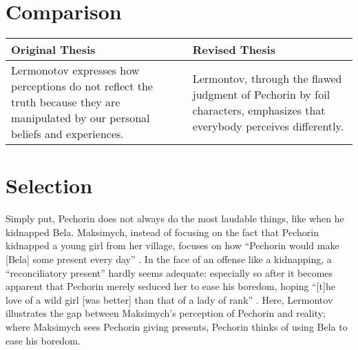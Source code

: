 \documentclass[a4paper,12pt]{article}
\newcommand{\mcite}{\mancite\cite}
\begin{document}
    \section{Comparison}
        \begin{tabular}{|p{}|p{}|}
            \hline
            \bfseries Original Thesis & \bfseries Revised Thesis
            \\\hline
            Lermonotov expresses how perceptions do not reflect the truth because they are
            manipulated by our personal beliefs and experiences.
            &
            Lermontov, through the flawed judgment of Pechorin by foil characters, emphasizes
            that everybody perceives differently.
            \\\hline
        \end{tabular}

    \section{Selection}
        Simply put, Pechorin does not always do the most laudable things, like when he kidnapped Bela.
        Maksimych, instead of focusing on the fact that Pechorin kidnapped a young girl from her village,
        focuses on how ``Pechorin would make [Bela] some present every day'' \mcite[35]{book}. In the face
        of an offense like a kidnapping, a ``reconciliatory present'' hardly seems adequate: especially so
        after it becomes apparent that Pechorin merely seduced her to ease his boredom, hoping ``[t]he
        love of a wild girl [was better] than that of a lady of rank'' \mcite[48]{book}. Here, Lermontov
        illustrates  the gap between Maksimych's perception of Pechorin and reality; where Maksimych
        sees Pechorin giving presents, Pechorin thinks of using Bela to ease his boredom.
\end{document}
